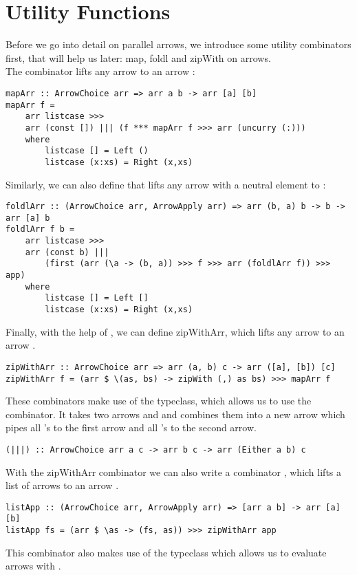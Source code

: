 \section{Utility Functions}\label{utilfns}
Before we go into detail on parallel arrows, we introduce some utility combinators first, that will help us later: map, foldl and zipWith on arrows.
\\
The  combinator lifts any arrow  to an arrow  \cite{programming_with_arrows}:
\begin{lstlisting}[frame=htrbl]
mapArr :: ArrowChoice arr => arr a b -> arr [a] [b]
mapArr f =
	arr listcase >>>
	arr (const []) ||| (f *** mapArr f >>> arr (uncurry (:)))
	where
		listcase [] = Left ()
		listcase (x:xs) = Right (x,xs)
\end{lstlisting}
Similarly, we can also define  that lifts any arrow  with a neutral element  to :
\begin{lstlisting}[frame=htrbl]
foldlArr :: (ArrowChoice arr, ArrowApply arr) => arr (b, a) b -> b -> arr [a] b
foldlArr f b =
	arr listcase >>>
	arr (const b) |||
		(first (arr (\a -> (b, a)) >>> f >>> arr (foldlArr f)) >>> app)
	where
		listcase [] = Left []
		listcase (x:xs) = Right (x,xs)
\end{lstlisting}
Finally, with the help of , we can define zipWithArr, which lifts any arrow  to an arrow .
\begin{lstlisting}[frame=htrbl]
zipWithArr :: ArrowChoice arr => arr (a, b) c -> arr ([a], [b]) [c]
zipWithArr f = (arr $ \(as, bs) -> zipWith (,) as bs) >>> mapArr f
\end{lstlisting}
These combinators make use of the  typeclass, which allows us to use the \code{|||} combinator. It takes two arrows  and  and combines them into a new arrow  which pipes all 's to the first arrow and all 's to the second arrow.
\begin{lstlisting}[frame=htrbl]
(|||) :: ArrowChoice arr a c -> arr b c -> arr (Either a b) c
\end{lstlisting}
With the zipWithArr combinator we can also write a combinator , which lifts a list of arrows \code{[arr a b]} to an arrow .
\begin{lstlisting}[frame=htrbl]
listApp :: (ArrowChoice arr, ArrowApply arr) => [arr a b] -> arr [a] [b]
listApp fs = (arr $ \as -> (fs, as)) >>> zipWithArr app
\end{lstlisting}
This combinator also makes use of the  typeclass which allows us to evaluate arrows with .
